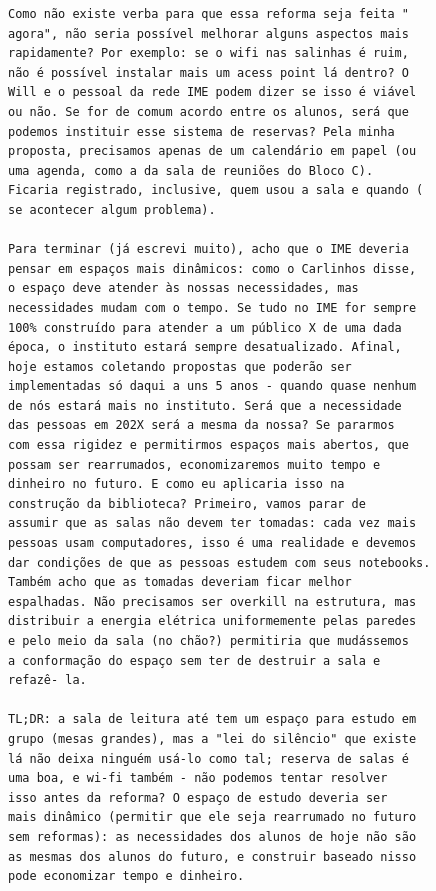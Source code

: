 \documentclass[titlepage]{article}
\begin{document}
\begin{lstlisting}[caption=Enviado por Renato Cordeiro]
Como não existe verba para que essa reforma seja feita "
agora", não seria possível melhorar alguns aspectos mais 
rapidamente? Por exemplo: se o wifi nas salinhas é ruim, 
não é possível instalar mais um acess point lá dentro? O 
Will e o pessoal da rede IME podem dizer se isso é viável 
ou não. Se for de comum acordo entre os alunos, será que 
podemos instituir esse sistema de reservas? Pela minha 
proposta, precisamos apenas de um calendário em papel (ou 
uma agenda, como a da sala de reuniões do Bloco C). 
Ficaria registrado, inclusive, quem usou a sala e quando (
se acontecer algum problema).

Para terminar (já escrevi muito), acho que o IME deveria 
pensar em espaços mais dinâmicos: como o Carlinhos disse, 
o espaço deve atender às nossas necessidades, mas 
necessidades mudam com o tempo. Se tudo no IME for sempre 
100% construído para atender a um público X de uma dada 
época, o instituto estará sempre desatualizado. Afinal, 
hoje estamos coletando propostas que poderão ser 
implementadas só daqui a uns 5 anos - quando quase nenhum 
de nós estará mais no instituto. Será que a necessidade 
das pessoas em 202X será a mesma da nossa? Se pararmos 
com essa rigidez e permitirmos espaços mais abertos, que 
possam ser rearrumados, economizaremos muito tempo e 
dinheiro no futuro. E como eu aplicaria isso na 
construção da biblioteca? Primeiro, vamos parar de 
assumir que as salas não devem ter tomadas: cada vez mais 
pessoas usam computadores, isso é uma realidade e devemos 
dar condições de que as pessoas estudem com seus notebooks.
Também acho que as tomadas deveriam ficar melhor 
espalhadas. Não precisamos ser overkill na estrutura, mas 
distribuir a energia elétrica uniformemente pelas paredes 
e pelo meio da sala (no chão?) permitiria que mudássemos 
a conformação do espaço sem ter de destruir a sala e 
refazê- la.

TL;DR: a sala de leitura até tem um espaço para estudo em 
grupo (mesas grandes), mas a "lei do silêncio" que existe 
lá não deixa ninguém usá-lo como tal; reserva de salas é 
uma boa, e wi-fi também - não podemos tentar resolver 
isso antes da reforma? O espaço de estudo deveria ser 
mais dinâmico (permitir que ele seja rearrumado no futuro 
sem reformas): as necessidades dos alunos de hoje não são 
as mesmas dos alunos do futuro, e construir baseado nisso 
pode economizar tempo e dinheiro.
\end{lstlisting}
\end{document}
